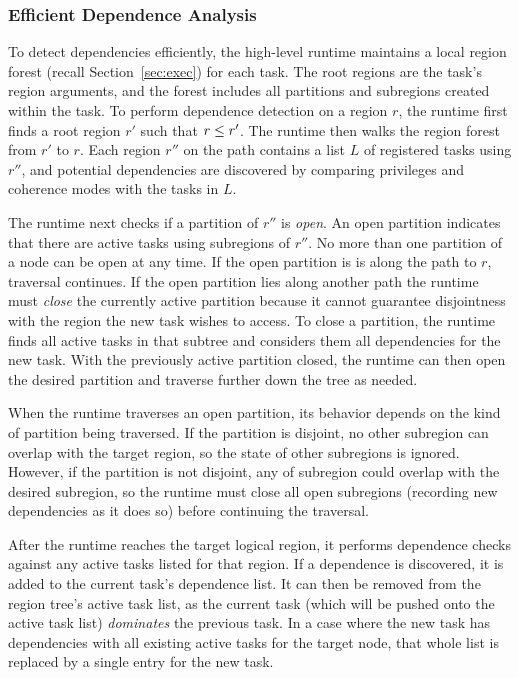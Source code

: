 \subsubsection{Efficient Dependence Analysis}





To detect dependencies efficiently, the high-level runtime maintains a
local region forest (recall Section~\ref{sec:exec}) for each task.  The
root regions are the task's region arguments, and the forest includes
all partitions and subregions created within the task.  To perform
dependence detection on a region $r$, the runtime first finds a root
region $r'$ such that $r \leq r'$.  The runtime then walks the region
forest from $r'$ to $r$.  Each region $r''$ on the path contains a
list $L$ of registered tasks using $r''$, and potential dependencies
are discovered by comparing privileges and coherence modes with the
tasks in $L$.

The runtime next checks if a partition of $r''$ is {\em open}.  An
open partition indicates that there are active tasks using subregions
of $r''$.  No more than one partition of a node can be open
at any time.  If the open partition is is along the path to $r$,
traversal continues.  If the open partition lies along another
path the runtime must {\em close} the currently active partition because it cannot guarantee
disjointness with the region the new task wishes to access.  To close a
partition, the runtime finds all active tasks in that
subtree and considers them all dependencies for the new task.
With the previously active partition closed, the runtime can
then open the desired partition and traverse further down the tree as
needed.

When the runtime traverses an open partition, its behavior depends on the kind
of partition being traversed.  If the partition is disjoint, no other subregion
can overlap with the target region, so the state of other subregions is
ignored.  However, if the partition is not disjoint, any
of subregion could overlap with the desired subregion, so
the runtime must close all open subregions (recording new dependencies
as it does so) before continuing the traversal.

After the runtime reaches the target logical region, it performs dependence
checks against any active tasks listed for that region.  If a dependence is
discovered, it is added to the current task's dependence list.  It can then
be removed from the region tree's active task list, as the current task (which
will be pushed onto the active task list) {\em dominates} the previous task.
In a case where the new task has dependencies with all existing active tasks
for the target node, that whole list is replaced by a single entry for the
new task.


